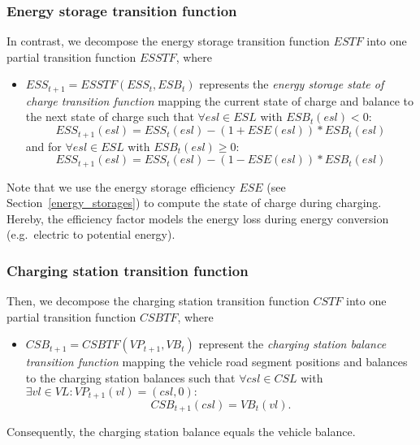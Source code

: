 \subsubsection{Energy storage transition function}
\label{transitions_storages}

In contrast, we decompose the energy storage transition function $ESTF$ into one partial transition function $ESSTF$, where
\begin{itemize}
%	
	\item $ESS_{t+1} = ESSTF(ESS_t, ESB_t)$ represents the \textit{energy storage state of charge transition function} mapping the current state of charge and balance to the next state of charge such that $\forall esl \in ESL$ with $ESB_t(esl) < 0:$
	\[
	 ESS_{t+1}(esl) = ESS_t(esl) - (1+ESE(esl)) * ESB_t(esl)
	\]
	and for $\forall esl \in ESL$ with $ESB_t(esl) \geq 0:$
	\[
	ESS_{t+1}(esl) = ESS_t(esl) - (1-ESE(esl)) * ESB_t(esl)
	\]
	
\end{itemize}
Note that we use the energy storage efficiency $ESE$ (see Section~\ref{energy_storages}) to compute the state of charge during charging. Hereby, the efficiency factor models the energy loss during energy conversion (e.g.\ electric to potential energy). 

\subsubsection{Charging station transition function}
\label{transitions_stations}

Then, we decompose the charging station transition function $CSTF$ into one partial transition function $CSBTF$, where
\begin{itemize}
	\item $CSB_{t+1} = CSBTF(VP_{t+1}, VB_t)$ represent the \textit{charging station balance transition function} mapping the vehicle road segment positions and balances to the charging station balances such that $\forall csl \in CSL$ with $\exists vl \in VL: VP_{t+1}(vl) = (csl, 0):$
	\[
		CSB_{t+1}(csl) = VB_{t}(vl) \textrm{.}
	\]
\end{itemize}
Consequently, the charging station balance equals the vehicle balance.

